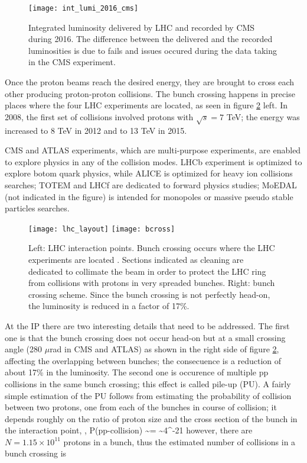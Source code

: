\begin{figure}[!h]
\centering
\texttt{[image: int\_lumi\_2016\_cms]}
\caption [2016 CMS Integrated luminosity]{Integrated luminosity delivered by LHC and recorded by CMS during 2016. The difference between the delivered and the recorded luminosities is due to fails and issues occured during the data taking in the CMS experiment\cite{lumi}.}\label{fig:lumi}
\end{figure}

\noindent Once the proton beams reach the desired energy, they are brought to cross each other producing proton-proton collisions. The bunch crossing happens in precise places where the four LHC experiments are located, as seen in figure \ref{fig:lhc_layout} left. In 2008, the first set of collisions involved protons with $\sqrt{s}=7$ TeV; the energy was increased to 8 TeV in 2012 and to 13 TeV in 2015.

\noindent CMS and ATLAS experiments, which are multi-purpose experiments, are enabled to explore physics in any of the collision modes. LHCb experiment is optimized to explore botom quark physics, while ALICE is optimized for heavy ion collisions searches; TOTEM and LHCf are dedicated to forward physics studies; MoEDAL (not indicated in the figure) is intended for monopoles or massive pseudo stable particles searches.

\begin{figure}[!h]
\centering
\texttt{[image: lhc\_layout]}
\texttt{[image: bcross]}
\caption [LHC interaction points]{Left: LHC interaction points. Bunch crossing occurs where the LHC experiments are located \cite{lhc_layout}. Sections indicated as cleaning are dedicated to collimate the beam in order to protect the LHC ring from collisions with protons in very spreaded bunches. Right: bunch crossing scheme. Since the bunch crossing is not perfectly head-on, the luminosity is reduced in a factor of 17\%.}\label{fig:lhc_layout}
\end{figure}

\noindent At the IP there are two interesting details that need to be addressed. The first one is that the bunch crossing does not occur head-on but at a small crossing angle (280 $\mu$rad in CMS and ATLAS) as shown in the right side of figure \ref{fig:lhc_layout}, affecting the overlapping between bunches; the consecuence is a reduction of about 17\% in the luminosity. The second one is occurence of multiple pp collisions in the same bunch crossing; this effect is called pile-up (PU). A fairly simple estimation of the PU follows from estimating the probability of collision between two protons, one from each of the bunches in course of collision; it depends roughly on the ratio of proton size and the cross section of the bunch in the interaction point, \ie,
\beqn
P(pp-collision) \sim {}= \sim 4^{-21}
\eeqn
\noindent however, there are $N=1.15\times 10^{11}$ protons in a bunch, thus the estimated number of collisions in a bunch crossing is

